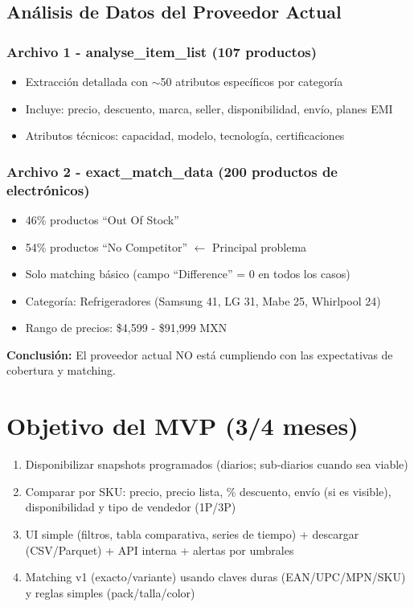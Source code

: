 \documentclass[12pt,a4paper]{article}
\begin{document}
\subsection{Análisis de Datos del Proveedor Actual}

\subsubsection*{Archivo 1 - analyse\_item\_list (107 productos)}
\begin{itemize}[leftmargin=*]
    \item Extracción detallada con $\sim$50 atributos específicos por categoría
    \item Incluye: precio, descuento, marca, seller, disponibilidad, envío, planes EMI
    \item Atributos técnicos: capacidad, modelo, tecnología, certificaciones
\end{itemize}

\subsubsection*{Archivo 2 - exact\_match\_data (200 productos de electrónicos)}
\begin{itemize}[leftmargin=*]
    \item \textcolor{warningyellow}{46\% productos ``Out Of Stock''}
    \item \textcolor{dangerred}{54\% productos ``No Competitor''} $\leftarrow$ Principal problema
    \item Solo matching básico (campo ``Difference'' = 0 en todos los casos)
    \item Categoría: Refrigeradores (Samsung 41, LG 31, Mabe 25, Whirlpool 24)
    \item Rango de precios: \$4,599 - \$91,999 MXN
\end{itemize}

\textbf{Conclusión:} El proveedor actual \textcolor{dangerred}{NO} está cumpliendo con las expectativas de cobertura y matching.

\section{Objetivo del MVP (3/4 meses)}

\begin{enumerate}[leftmargin=*]
    \item Disponibilizar snapshots programados (diarios; sub-diarios cuando sea viable)
    \item Comparar por SKU: precio, precio lista, \% descuento, envío (si es visible), disponibilidad y tipo de vendedor (1P/3P)
    \item UI simple (filtros, tabla comparativa, series de tiempo) + descargar (CSV/Parquet) + API interna + alertas por umbrales
    \item Matching v1 (exacto/variante) usando claves duras (EAN/UPC/MPN/SKU) y reglas simples (pack/talla/color)
\end{enumerate}
\end{document}
